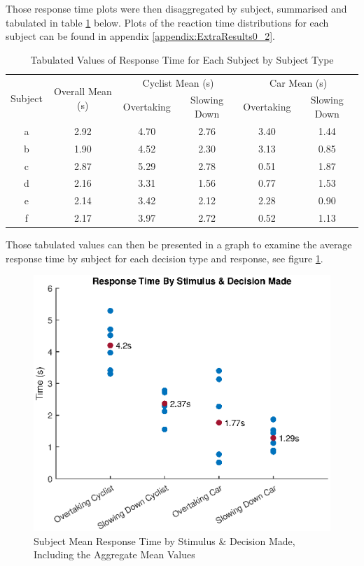 Those response time plots were then disaggregated by subject, summarised and tabulated in table \ref{tab:RSLT_responseSummary} below. Plots of the reaction time distributions for each subject can be found in appendix \ref{appendix:ExtraResults0_2}.
\begin{table}[H]
    \begin{center}
        \caption{Tabulated Values of Response Time for Each Subject by Subject Type}
        \label{tab:RSLT_responseSummary}
        \begin{tabular}{cccccc}
        \hline
        \multirow{2}{*}{Subject} & \multirow{2}{*}{Overall Mean (s)} & \multicolumn{2}{c}{Cyclist Mean (s)} & \multicolumn{2}{c}{Car Mean (s)}  \\ \cline{3-6} 
                                &           & Overtaking    & Slowing Down  & Overtaking & Slowing Down \\ \hline
        a                       &   2.92    & 4.70          & 2.76          & 3.40      &   1.44        \\
        b                       &   1.90    & 4.52          & 2.30          & 3.13      &   0.85        \\
        c                       &   2.87    & 5.29          & 2.78          & 0.51      &   1.87        \\
        d                       &   2.16    & 3.31          & 1.56          & 0.77      &   1.53        \\
        e                       &   2.14    & 3.42          & 2.12          & 2.28      &   0.90        \\
        f                       &   2.17    & 3.97          & 2.72          & 0.52      &   1.13        \\ \hline
        \end{tabular}
    \end{center}
\end{table}

Those tabulated values can then be presented in a graph to examine the average response time by subject for each decision type and response, see figure \ref{fig:RT_SubjectMean}.
\begin{figure}[H]
    \centering
    \includegraphics[width=0.6\linewidth]{figures/ReactionTimeMean.eps}
    \caption{Subject Mean Response Time by Stimulus \& Decision Made, Including the Aggregate Mean Values}
    \label{fig:RT_SubjectMean}
\end{figure}

